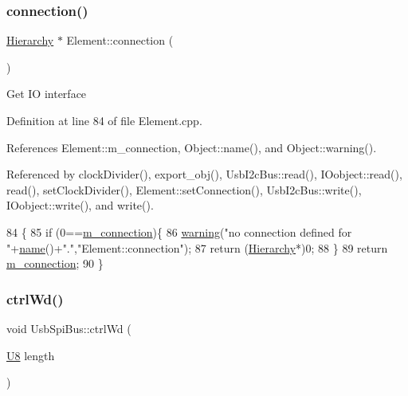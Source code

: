 \subsubsection{\texorpdfstring{connection()}{connection()}}
{\footnotesize\ttfamily \hyperlink{classHierarchy}{Hierarchy} $\ast$ Element\+::connection (\begin{DoxyParamCaption}{ }\end{DoxyParamCaption})\hspace{0.3cm}{\ttfamily [inherited]}}

Get IO interface 

Definition at line 84 of file Element.\+cpp.



References Element\+::m\+\_\+connection, Object\+::name(), and Object\+::warning().



Referenced by clock\+Divider(), export\+\_\+obj(), Usb\+I2c\+Bus\+::read(), I\+Oobject\+::read(), read(), set\+Clock\+Divider(), Element\+::set\+Connection(), Usb\+I2c\+Bus\+::write(), I\+Oobject\+::write(), and write().


\begin{DoxyCode}
84                               \{
85   \textcolor{keywordflow}{if} (0==\hyperlink{classElement_abe3de7a5dbbc9a6dd2d7e012e5fdb266}{m\_connection})\{
86     \hyperlink{classObject_a65cd4fda577711660821fd2cd5a3b4c9}{warning}(\textcolor{stringliteral}{"no connection defined for "}+\hyperlink{classObject_a300f4c05dd468c7bb8b3c968868443c1}{name}()+\textcolor{stringliteral}{"."},\textcolor{stringliteral}{"Element::connection"});
87     \textcolor{keywordflow}{return} (\hyperlink{classHierarchy}{Hierarchy}*)0;
88   \}
89   \textcolor{keywordflow}{return} \hyperlink{classElement_abe3de7a5dbbc9a6dd2d7e012e5fdb266}{m\_connection};
90 \}
\end{DoxyCode}
\mbox{\label{classUsbSpiBus_a150304008d73d14c93d25765050ddb05}} 
\subsubsection{\texorpdfstring{ctrl\+Wd()}{ctrlWd()}}
{\footnotesize\ttfamily void Usb\+Spi\+Bus\+::ctrl\+Wd (\begin{DoxyParamCaption}\item[{\hyperlink{classUsbSpiBus_a11336f4ad104fbd4fb454be044f19fc8}{U8}}]{length }\end{DoxyParamCaption})}



